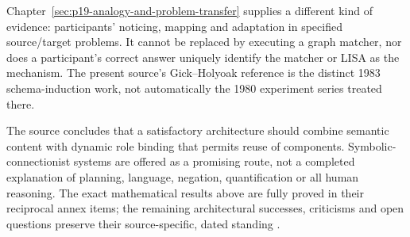 Chapter~\ref{sec:p19-analogy-and-problem-transfer} supplies a different
kind of evidence: participants' noticing, mapping and adaptation in
specified source/target problems. It cannot be replaced by executing
a graph matcher, nor does a participant's correct answer uniquely
identify the matcher or LISA as the mechanism. The present source's
Gick--Holyoak reference is the distinct 1983 schema-induction work,
not automatically the 1980 experiment series treated there.

The source concludes that a satisfactory architecture should combine
semantic content with dynamic role binding that permits reuse of
components. Symbolic-connectionist systems are offered as a promising
route, not a completed explanation of planning, language, negation,
quantification or all human reasoning. The exact mathematical results
above are fully proved in their reciprocal annex items; the remaining
architectural successes, criticisms and open questions preserve their
source-specific, dated standing
\parencite[pp.~63--66]{DoumasHummel2012HigherCognition}.

